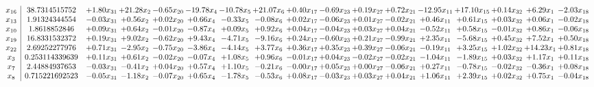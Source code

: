 \documentclass[9pt]{article}
\begin{document}
 \[\begin{array}{c| c c@{\hskip 2pt} c@{\hskip 2pt} c@{\hskip 2pt} c@{\hskip 2pt} c@{\hskip 2pt} c@{\hskip 2pt} c@{\hskip 2pt} c@{\hskip 2pt} c@{\hskip 2pt} c@{\hskip 2pt} c@{\hskip 2pt} c@{\hskip 2pt} c@{\hskip 2pt} c@{\hskip 2pt} c@{\hskip 2pt} }
 x_{16}   &  38.7314515752 & +  1.80 x_{31} & + 21.28 x_{2} & -0.65 x_{20} & -19.78 x_{4} & -10.78 x_{5} & + 21.07 x_{6} & +  0.40 x_{17} & -0.69 x_{23} & +  0.19 x_{27} & +  0.72 x_{21} & -12.95 x_{11} & + 17.10 x_{15} & +  0.14 x_{32} & +  6.29 x_{1} & -2.03 x_{18}\\
 x_{13}   &  1.91324344554 & -0.03 x_{31} & +  0.56 x_{2} & +  0.02 x_{20} & +  0.66 x_{4} & -0.33 x_{5} & -0.08 x_{6} & +  0.02 x_{17} & -0.06 x_{23} & +  0.01 x_{27} & -0.02 x_{21} & +  0.46 x_{11} & +  0.61 x_{15} & +  0.03 x_{32} & +  0.06 x_{1} & -0.02 x_{18}\\
 x_{10}   &  1.8618852846 & +  0.09 x_{31} & +  0.64 x_{2} & -0.01 x_{20} & -0.87 x_{4} & +  0.09 x_{5} & +  0.92 x_{6} & +  0.04 x_{17} & -0.04 x_{23} & +  0.03 x_{27} & +  0.04 x_{21} & -0.52 x_{11} & +  0.58 x_{15} & -0.01 x_{32} & +  0.86 x_{1} & -0.06 x_{18}\\
 x_{19}   &  16.8331532372 & +  0.19 x_{31} & +  9.02 x_{2} & -0.62 x_{20} & +  9.43 x_{4} & -4.71 x_{5} & -9.16 x_{6} & +  0.24 x_{17} & -0.60 x_{23} & +  0.21 x_{27} & -0.99 x_{21} & +  2.35 x_{11} & -5.68 x_{15} & +  0.45 x_{32} & +  7.52 x_{1} & +  0.50 x_{18}\\
 x_{22}   &  2.69252277976 & +  0.71 x_{31} & -2.95 x_{2} & -0.75 x_{20} & -3.86 x_{4} & -4.14 x_{5} & +  3.77 x_{6} & +  0.36 x_{17} & +  0.35 x_{23} & +  0.39 x_{27} & -0.06 x_{21} & -0.19 x_{11} & +  3.25 x_{15} & +  1.02 x_{32} & + 14.23 x_{1} & +  0.81 x_{18}\\
 x_{3}   &  0.253114339639 & +  0.11 x_{31} & +  0.61 x_{2} & -0.02 x_{20} & -0.07 x_{4} & +  1.08 x_{5} & +  0.96 x_{6} & -0.01 x_{17} & +  0.04 x_{23} & -0.02 x_{27} & -0.02 x_{21} & -1.04 x_{11} & -1.89 x_{15} & +  0.03 x_{32} & +  1.17 x_{1} & +  0.11 x_{18}\\
 x_{7}   &  2.44884937653 & -0.03 x_{31} & -0.41 x_{2} & +  0.04 x_{20} & +  0.57 x_{4} & +  1.10 x_{5} & -0.21 x_{6} & -0.00 x_{17} & +  0.05 x_{23} & +  0.00 x_{27} & -0.06 x_{21} & +  0.27 x_{11} & -0.78 x_{15} & -0.02 x_{32} & -0.36 x_{1} & +  0.08 x_{18}\\
 x_{8}   &  0.715221692523 & -0.05 x_{31} & -1.18 x_{2} & -0.07 x_{20} & +  0.65 x_{4} & -1.78 x_{5} & -0.53 x_{6} & +  0.08 x_{17} & -0.03 x_{23} & +  0.03 x_{27} & +  0.04 x_{21} & +  1.06 x_{11} & +  2.39 x_{15} & +  0.02 x_{32} & +  0.75 x_{1} & -0.04 x_{18}\\

\end{array}\]
\end{document}
